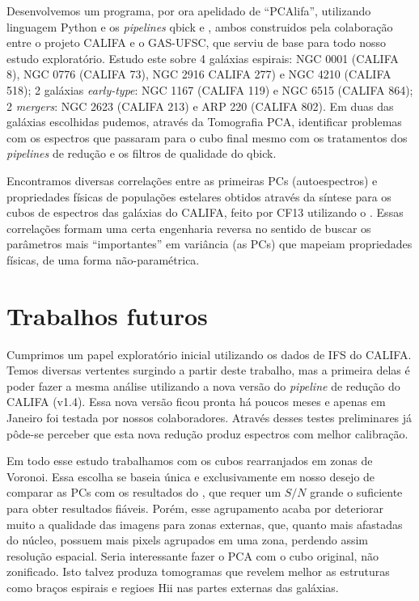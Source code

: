 Desenvolvemos um programa, por ora apelidado de ``PCAlifa'', utilizando linguagem Python e os {\em pipelines} {\sc
qbick} e \pycasso, ambos construidos pela colaboração entre o projeto CALIFA e o GAS-UFSC, que serviu de base para todo
nosso estudo exploratório. Estudo este sobre 4 galáxias espirais: NGC 0001 (CALIFA 8), NGC 0776 (CALIFA 73), NGC 2916
CALIFA 277) e NGC 4210 (CALIFA 518); 2 galáxias {\em early-type}: NGC 1167 (CALIFA 119) e NGC 6515 (CALIFA 864); 2 {\em
mergers}: NGC 2623 (CALIFA 213) e ARP 220 (CALIFA 802). Em duas das galáxias escolhidas pudemos, através da Tomografia
PCA, identificar problemas com os espectros que passaram para o cubo final mesmo com os tratamentos dos {\em pipelines}
de redução e os filtros de qualidade do {\sc qbick}.

Encontramos diversas correlações entre as primeiras PCs (autoespectros) e propriedades físicas de populações estelares
obtidos através da síntese para os cubos de espectros das galáxias do CALIFA, feito por CF13 utilizando o \starlight.
Essas correlações formam uma certa engenharia reversa no sentido de buscar os parâmetros mais ``importantes'' em
variância (as PCs) que mapeiam propriedades físicas, de uma forma não-paramétrica.

\section{Trabalhos futuros}
\label{sec:conclusao:futWorks}

Cumprimos um papel exploratório inicial utilizando os dados de IFS do CALIFA. Temos diversas vertentes surgindo a partir
deste trabalho, mas a primeira delas é poder fazer a mesma análise utilizando a nova versão do {\em pipeline} de redução
do CALIFA (v1.4). Essa nova versão ficou pronta há poucos meses e apenas em Janeiro foi testada por nossos
colaboradores. Através desses testes preliminares já pôde-se perceber que esta nova redução produz espectros com melhor
calibração.

Em todo esse estudo trabalhamos com os cubos rearranjados em zonas de Voronoi. Essa escolha se baseia única e
exclusivamente em nosso desejo de comparar as PCs com os resultados do \starlight, que requer um $S/N$ grande o
suficiente para obter resultados fiáveis. Porém, esse agrupamento acaba por deteriorar muito a qualidade das imagens
para zonas externas, que, quanto mais afastadas do núcleo, possuem mais pixels agrupados em uma zona, perdendo assim
resolução espacial. Seria interessante fazer o PCA com o cubo original, não zonificado. Isto talvez produza tomogramas
que revelem melhor as estruturas como braços espirais e regioes H{\sc ii} nas partes externas das galáxias.

